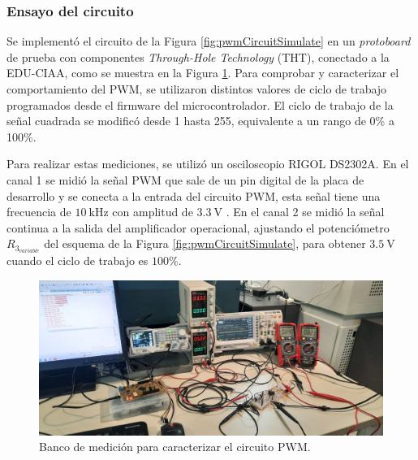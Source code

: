\subsubsection{Ensayo del circuito}

Se implementó el circuito de la Figura \ref{fig:pwmCircuitSimulate} en un \textit{protoboard} de prueba con componentes \textit{Through-Hole Technology} (THT), conectado a la EDU-CIAA, como se muestra en la Figura \ref{fig:BancoMedicion1}. Para comprobar y caracterizar el comportamiento del PWM, se utilizaron distintos valores de ciclo de trabajo programados desde el firmware del microcontrolador. El ciclo de trabajo de la señal cuadrada se modificó desde 1 hasta 255, equivalente a un rango de 0\% a 100\%.

Para realizar estas mediciones, se utilizó un osciloscopio RIGOL DS2302A. En el canal 1 se midió la señal PWM que sale de un pin digital de la placa de desarrollo y se conecta a la entrada del circuito PWM, esta señal tiene una frecuencia de $\SI{10}{\kilo\hertz}$ con amplitud de $\SI{3.3}{\volt}$ . En el canal 2 se midió la señal continua a la salida del amplificador operacional, ajustando el potenciómetro $R_{3_{variable}}$ del esquema de la Figura \ref{fig:pwmCircuitSimulate}, para obtener $\SI{3.5}{\volt}$ cuando el ciclo de trabajo es $100\%$.


\begin{figure}[H]
    \centering
    \includegraphics[width=1\linewidth]{Figuras/datalogger/Hardware/BancoMedicion1.jpg}
    \caption{Banco de medición para caracterizar el circuito PWM.}
    \label{fig:BancoMedicion1}
\end{figure}

